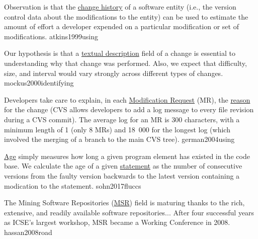 \documentclass{article}
\begin{document}
  {Observation is that the \ul{change history} of a software entity (i.e., the version control data about the modifications to the entity) can be used to estimate the amount of effort a developer expended on a particular modification or set of modifications.}
  {atkins1999using}

  {Our hypothesis is that a \ul{textual description} field of a change is essential to understanding why that change was performed. Also, we expect that difficulty, size, and interval would vary strongly across different types of changes.}
  {mockus2000identifying}


  {Developers take care to explain, in each \ul{Modification Request} (MR), the \ul{reason} for the change (CVS allows developers to add a log message to every file revision during a CVS commit). The average log for an MR is 300 characters, with a minimum length of 1 (only 8 MRs) and 18~000 for the longest log (which involved the merging of a branch to the main CVS tree).}
  {german2004using}

  {\ul{Age} simply measures how long a given program element has existed in the code base. We calculate the age of a given \ul{statement} as the number of consecutive versions from the faulty version backwards to the latest version containing a modication to the statement.}
  {sohn2017fluccs}


  {The Mining Software Repositories (\ul{MSR}) field is maturing thanks to the rich, extensive, and readily available software repositories... After four successful years as ICSE's largest workshop, MSR became a Working Conference in 2008.}
  {hassan2008road}
\end{document}
